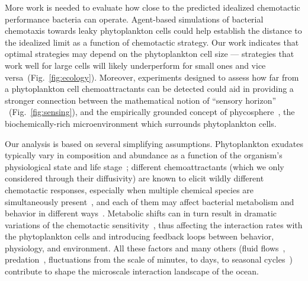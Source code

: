 \documentclass[9pt,twocolumn,twoside]{pnas-new}
\begin{document}
More work is needed to evaluate how close to the predicted idealized chemotactic performance bacteria can operate. Agent-based simulations of bacterial chemotaxis towards leaky phytoplankton cells could help establish the distance to the idealized limit as a function of chemotactic strategy. Our work indicates that optimal strategies may depend on the phytoplankton cell size --- strategies that work well for large cells will likely underperform for small ones and vice versa~(Fig.~\ref{fig:ecology}). Moreover, experiments designed to assess how far from a phytoplankton cell chemoattractants can be detected could aid in providing a stronger connection between the mathematical notion of ``sensory horizon'' ~(Fig.~\ref{fig:sensing}), and the empirically grounded concept of phycosphere~\cite{seymour2017zooming,bell1972chemotactic,platt2023probing}, the biochemically-rich microenvironment which surrounds phytoplankton cells.

Our analysis is based on several simplifying assumptions. Phytoplankton exudates typically vary in composition and abundance as a function of the organism's physiological state and life stage~\cite{maranon2004significance,thornton2014dissolved,seymour2017zooming}; different chemoattractants (which we only considered through their diffusivity) are known to elicit wildly different chemotactic responses, especially when multiple chemical species are simultaneously present~\cite{clerc2023strong,li2024phenotypic}, and each of them may affect bacterial metabolism and behavior in different ways~\cite{barak-gavish2023bacterial,stubbusch2023polysaccharide}. Metabolic shifts can in turn result in dramatic variations of the chemotactic sensitivity~\cite{}, thus affecting the interaction rates with the phytoplankton cells and introducing feedback loops between behavior, physiology, and environment. All these factors and many others (fluid flows~\cite{bowen1993simulating,blackburn1999influence,kiorboe2001marine,taylor2012tradeoffs}, predation~\cite{nielsen2021foraging}, fluctuations from the scale of minutes, to days, to seasonal cycles~\cite{bernhardt2020life,karin2021temporal,nguyen2021environmental}) contribute to shape the microscale interaction landscape of the ocean. 


\end{document}
